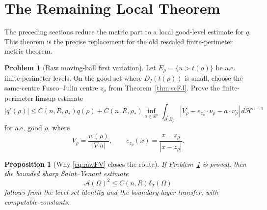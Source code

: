 \documentclass[11pt]{article}
\newtheorem{proposition}[theorem]{Proposition}
\theoremstyle{definition}
\newtheorem{problem}[theorem]{Problem}
\newcommand{\R}{\mathbb R}
\newcommand{\Fr}{\mathcal A}
\newcommand{\HH}{\mathcal H}
\newcommand{\dT}{\delta_T}
\newcommand{\rstar}{\rho_*}
\newcommand{\wt}{w}
\begin{document}
\section{The Remaining Local Theorem}

The preceding sections reduce the metric part to a local good-level estimate
for \(q\).  This theorem is the precise replacement for the old rescaled
finite-perimeter metric theorem.

\begin{problem}[Raw moving-ball first variation]\label{prob:rawFV}
Let \(E_\rho=\{u>t(\rho)\}\) be a.e. finite-perimeter levels.  On the good
set where \(D_I(t(\rho))\) is small, choose the same-centre
Fusco--Julin centre \(z_\rho\) from Theorem~\ref{thm:scFJ}.  Prove the
finite-perimeter limsup estimate
\begin{equation}\label{eq:rawFV}
   |q'(\rho)|
   \le C(n,R,\rstar)q(\rho)
   +C(n,R,\rstar)\inf_{a\in\R^n}
      \int_{\partial^*E_\rho}
      |V_\rho-e_{z_\rho}\cdot\nu_\rho-a\cdot\nu_\rho|
      \,d\HH^{n-1}
\end{equation}
for a.e. good \(\rho\), where
\[
   V_\rho=\frac{\wt(\rho)}{|\nabla u|},\qquad
   e_{z_\rho}(x)=\frac{x-z_\rho}{|x-z_\rho|}.
\]
\end{problem}

\begin{proposition}[Why \eqref{eq:rawFV} closes the route]\label{prop:rawcloses}
If Problem~\ref{prob:rawFV} is proved, then the bounded sharp
Saint--Venant estimate
\[
   \Fr(\Omega)^2\le C(n,R)\dT(\Omega)
\]
follows from the level-set identity and the boundary-layer transfer, with
computable constants.
\end{proposition}
\end{document}
